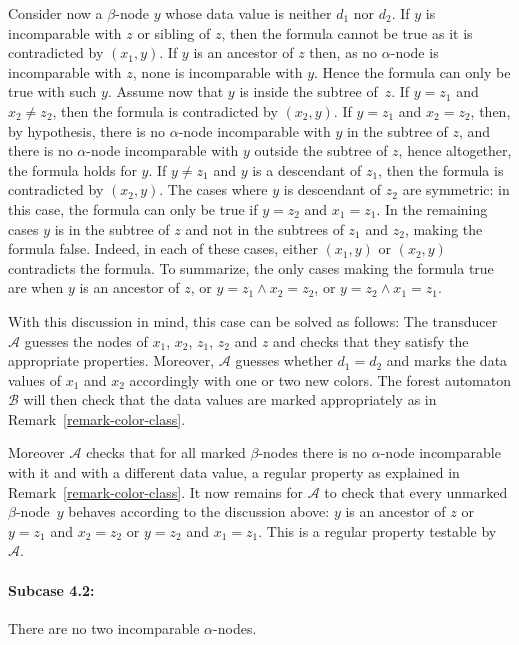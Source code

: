 \documentclass{CSML}
\newcommand\Aa{\mathcal{A}}
\newcommand\Ba{\mathcal{B}}
\begin{document}
Consider now a $\beta$-node $y$ whose data value is neither $d_1$ nor $d_2$.
If $y$ is incomparable with $z$ or sibling of $z$, then the formula cannot be true as
it is contradicted by $(x_1,y)$.  If $y$ is an ancestor of $z$ then, as no
$\alpha$-node is incomparable with $z$, none is incomparable with $y$. 
Hence the formula can only be true with such $y$.
Assume now that $y$ is inside the subtree of~$z$. 
If $y = z_1$ and $x_2 \neq z_2$, then the formula is contradicted by $(x_2, y)$.
If $y = z_1$ and $x_2 = z_2$, then, by hypothesis, 
there is no $\alpha$-node incomparable with $y$ in the subtree of $z$, 
and there is no $\alpha$-node incomparable with $y$ outside the subtree of $z$,
hence altogether, the formula holds for $y$.
If $y \neq z_1$ and $y$ is a descendant of $z_1$, 
then the formula is contradicted by $(x_2, y)$.
The cases where $y$ is descendant of $z_2$ are symmetric:
in this case, the formula can only be true if $y = z_2$ and $x_1 = z_1$.
In the remaining cases $y$ is in the subtree of $z$ and not in the subtrees of
$z_1$ and $z_2$, making the formula false. Indeed, in each of these cases, either
$(x_1, y)$ or $(x_2, y)$ contradicts the formula.
To summarize, the only cases making the formula true
are when $y$ is an ancestor of $z$, 
or $y = z_1 \wedge x_2 = z_2$,
or $y = z_2 \wedge x_1 = z_1$.
 

With this discussion in mind, this case can be solved as follows:
The transducer $\Aa$ guesses the nodes of $x_1$, $x_2$, $z_1$, $z_2$ and $z$
and checks that they satisfy the appropriate properties. 
Moreover, $\Aa$ guesses whether $d_1=d_2$ 
and marks the data values of $x_1$ and $x_2$ accordingly
with one or two new colors. 
The forest automaton $\Ba$ will then check that the data values are marked
appropriately as in Remark~\ref{remark-color-class}.

Moreover $\Aa$ checks that for all marked $\beta$-nodes there is no
$\alpha$-node incomparable with it and with a different data value, a regular
property as explained in Remark~\ref{remark-color-class}.
It now remains for $\Aa$ to check that every unmarked $\beta$-node~$y$ behaves
according to the discussion above: 
$y$ is an ancestor of $z$ or $y = z_1$ and $x_2 = z_2$ or $y = z_2$ and $x_1 = z_1$.
This is a regular property testable by $\Aa$.

\paragraph{\bf Subcase 4.2:} There are no two incomparable $\alpha$-nodes. 
\end{document}
